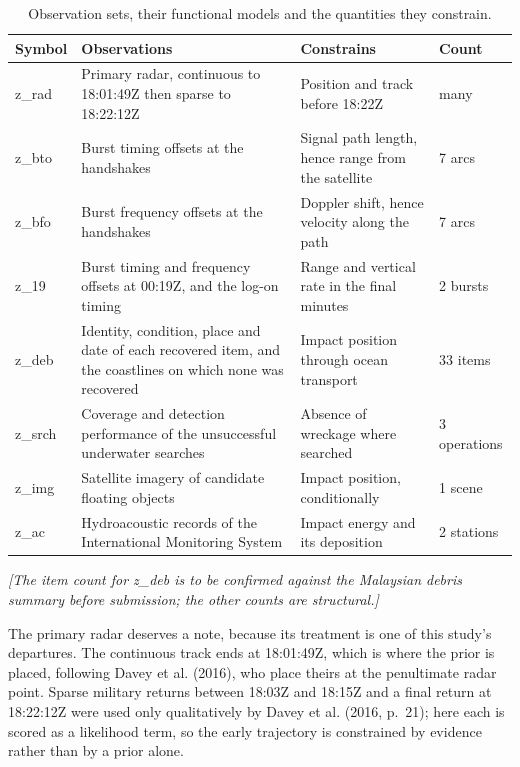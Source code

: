 \documentclass[12pt,a4paper]{article}
\begin{document}
\begin{table}[htbp]\centering\caption{Observation sets, their functional models and the quantities they constrain.}

\vspace{3pt}\small\begin{tabular}{@{}p{3.6cm}p{4.0cm}p{3.6cm}p{3.2cm}@{}}\toprule

Symbol & Observations & Constrains & Count \\ \midrule

z\_rad & Primary radar, continuous to 18:01:49Z then sparse to 18:22:12Z & Position and track before 18:22Z & many \\

z\_bto & Burst timing offsets at the handshakes & Signal path length, hence range from the satellite & 7 arcs \\

z\_bfo & Burst frequency offsets at the handshakes & Doppler shift, hence velocity along the path & 7 arcs \\

z\_19 & Burst timing and frequency offsets at 00:19Z, and the log-on timing & Range and vertical rate in the final minutes & 2 bursts \\

z\_deb & Identity, condition, place and date of each recovered item, and the coastlines on which none was recovered & Impact position through ocean transport & 33 items \\

z\_srch & Coverage and detection performance of the unsuccessful underwater searches & Absence of wreckage where searched & 3 operations \\

z\_img & Satellite imagery of candidate floating objects & Impact position, conditionally & 1 scene \\

z\_ac & Hydroacoustic records of the International Monitoring System & Impact energy and its deposition & 2 stations \\

\bottomrule\end{tabular}\end{table}

\noindent\textit{\small [The item count for z_deb is to be confirmed against the Malaysian debris summary before submission; the other counts are structural.]}

The primary radar deserves a note, because its treatment is one of this study's departures. The continuous track ends at 18:01:49Z, which is where the prior is placed, following Davey et al. (2016), who place theirs at the penultimate radar point. Sparse military returns between 18:03Z and 18:15Z and a final return at 18:22:12Z were used only qualitatively by Davey et al. (2016, p.~21); here each is scored as a likelihood term, so the early trajectory is constrained by evidence rather than by a prior alone.
\end{document}
